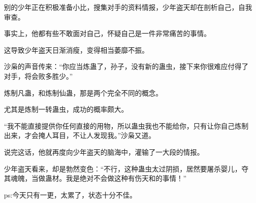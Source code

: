 \begin{this_body}
别的少年正在积极准备小比，搜集对手的资料情报，少年盗天却在剖析自己，自我审查。

事实上，他都有些不敢面对自己，怀疑自己是一件非常痛苦的事情。

这导致少年盗天日渐消瘦，变得相当萎靡不振。

沙枭的声音传来：“你应当炼蛊了，孙子，没有新的蛊虫，接下来你很难应付得了对手，将会败多胜少。”

炼制凡蛊，和炼制仙蛊，那是两个完全不同的概念。

尤其是炼制一转蛊虫，成功的概率颇大。

“我不能直接提供你任何直接的用物，所以蛊虫我也不能给你，只有让你自己炼制出来，才会掩人耳目，不让人发现我。”沙枭又道。

说完这话，他就再度向少年盗天的脑海中，灌输了一大段的情报。

少年盗天看来，却是勃然变色：“不行，这种蛊虫太过阴损，居然要屠杀婴儿，夺其魂魄，当做蛊材。我是绝对不会做这种有伤天和的事情！”

ps:今天只有一更，太累了，状态十分不佳。

\end{this_body}

